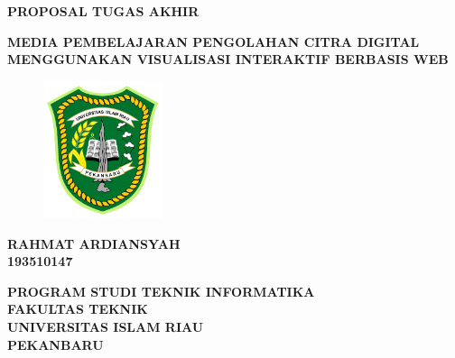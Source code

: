 \begin{titlepage}
\thispagestyle{empty}
    \begin{center}
        \begin{large}\begin{spacing}{1}
        \textbf{PROPOSAL TUGAS AKHIR}
        \end{spacing}\end{large}

        \vspace{2cm}
        \begin{large}\begin{spacing}{1}
        \textbf{MEDIA PEMBELAJARAN PENGOLAHAN CITRA DIGITAL MENGGUNAKAN VISUALISASI INTERAKTIF BERBASIS WEB}
        \end{spacing}\end{large}

        \vspace{2cm}
        \begin{figure}[h]
        \centering
        \includegraphics[width=3.5cm]{Gambar/Logo_UIR.png}
        \label{fig:unpadlogo}
        \end{figure}

        \vspace{1cm}
        \textbf{RAHMAT ARDIANSYAH\\
        193510147}

        \vspace{4cm}
        \textbf{PROGRAM STUDI TEKNIK INFORMATIKA\\
        FAKULTAS TEKNIK\\
        UNIVERSITAS ISLAM RIAU\\
        PEKANBARU \\
        }
        \textbf{\large \the\year{}}
    \end{center}
\end{titlepage}
